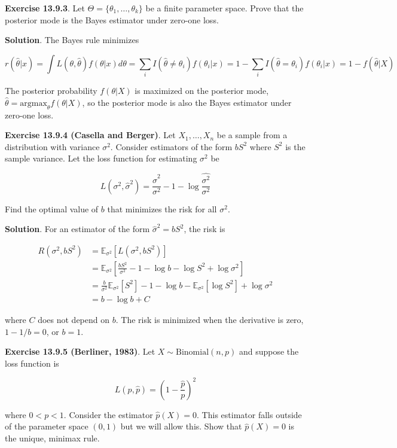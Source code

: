 \textbf{Exercise 13.9.3}. Let
\(\Theta = \{ \theta_{1}, \dots, \theta_{k} \}\) be a finite parameter
space. Prove that the posterior mode is the Bayes estimator under
zero-one loss.

\textbf{Solution}. The Bayes rule minimizes

\[r(\hat{\theta} | x) = \int L(\theta, \hat{\theta}) f(\theta | x) d\theta = \sum_{i} I(\hat{\theta} \neq \theta_{i}) f(\theta_{i} | x) = 1 - \sum_{i} I(\hat{\theta} = \theta_{i}) f(\theta_{i} | x) = 1 - f(\hat{\theta} | X)\]

The posterior probability \(f(\theta | X)\) is maximized on the
posterior mode, \(\hat{\theta} = \text{argmax}_\theta f(\theta | X)\),
so the posterior mode is also the Bayes estimator under zero-one loss.

\textbf{Exercise 13.9.4 (Casella and Berger)}. Let \(X_{1}, \dots, X_{n}\)
be a sample from a distribution with variance \(\sigma^{2}\). Consider
estimators of the form \(bS^{2}\) where \(S^{2}\) is the sample variance.
Let the loss function for estimating \(\sigma^{2}\) be

\[L(\sigma^{2}, \hat{\sigma}^{2}) = \frac{\hat{\sigma}^{2}}{\sigma^{2}} - 1 - \log \frac{\hat{\sigma^{2}}}{\sigma^{2}}\]

Find the optimal value of \(b\) that minimizes the risk for all
\(\sigma^{2}\).

\textbf{Solution}. For an estimator of the form
\(\hat{\sigma}^{2} = bS^{2}\), the risk is

\begin{align*}
R(\sigma^{2}, bS^{2}) &= \mathbb{E}_{\sigma^{2}}[ L(\sigma^{2}, bS^{2}) ]\\
&=\mathbb{E}_{\sigma^{2}}\left[\frac{bS^{2}}{\sigma^{2}} - 1 - \log b - \log S^{2} + \log \sigma^{2} \right] \\
&= \frac{b}{\sigma^{2}} \mathbb{E}_{\sigma^{2}}[S^{2}] - 1 -\log b - \mathbb{E}_{\sigma^{2}}[\log S^{2}] + \log \sigma^{2} \\
&= b - \log b + C
\end{align*}

where \(C\) does not depend on \(b\). The risk is minimized when the
derivative is zero, \(1 - 1/b = 0\), or \(b = 1\).

\textbf{Exercise 13.9.5 (Berliner, 1983)}. Let
\(X \sim \text{Binomial}(n, p)\) and suppose the loss function is

\[ L(p, \hat{p}) = \left(1 - \frac{\hat{p}}{p} \right)^{2}\]

where \(0 < p < 1\). Consider the estimator \(\hat{p}(X) = 0\). This
estimator falls outside of the parameter space \((0, 1)\) but we will
allow this. Show that \(\hat{p}(X) = 0\) is the unique, minimax rule.

